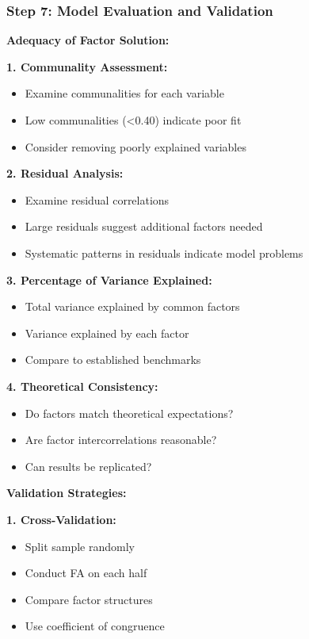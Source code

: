 \documentclass[
]{article}
\begin{document}
\subsubsection{Step 7: Model Evaluation and Validation}

\textbf{Adequacy of Factor Solution:}

\textbf{1. Communality Assessment:}

\begin{itemize}
\item
  Examine communalities for each variable
\item
  Low communalities (\textless0.40) indicate poor fit
\item
  Consider removing poorly explained variables
\end{itemize}

\textbf{2. Residual Analysis:}

\begin{itemize}
\item
  Examine residual correlations
\item
  Large residuals suggest additional factors needed
\item
  Systematic patterns in residuals indicate model problems
\end{itemize}

\textbf{3. Percentage of Variance Explained:}

\begin{itemize}
\item
  Total variance explained by common factors
\item
  Variance explained by each factor
\item
  Compare to established benchmarks
\end{itemize}

\textbf{4. Theoretical Consistency:}

\begin{itemize}
\item
  Do factors match theoretical expectations?
\item
  Are factor intercorrelations reasonable?
\item
  Can results be replicated?
\end{itemize}

\textbf{Validation Strategies:}

\textbf{1. Cross-Validation:}

\begin{itemize}
\item
  Split sample randomly
\item
  Conduct FA on each half
\item
  Compare factor structures
\item
  Use coefficient of congruence
\end{itemize}
\end{document}
